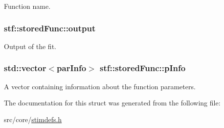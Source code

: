\label{structstf_1_1storedFunc_ac1fe235432b5de9f93817a573b6d9946}
Function name. \hypertarget{structstf_1_1storedFunc_aad9e1ffc2999387f61578bf9f7461224}{
\subsubsection[{output}]{ {\bf stf::storedFunc::output}}}
\label{structstf_1_1storedFunc_aad9e1ffc2999387f61578bf9f7461224}
Output of the fit. \hypertarget{structstf_1_1storedFunc_a2f09fc5276140a85ad4fa61bccc3fd61}{
\subsubsection[{pInfo}]{\setlength{\rightskip}{0pt plus 5cm}std::vector$<${\bf parInfo}$>$ {\bf stf::storedFunc::pInfo}}}
\label{structstf_1_1storedFunc_a2f09fc5276140a85ad4fa61bccc3fd61}
A vector containing information about the function parameters. 

The documentation for this struct was generated from the following file:\begin{DoxyCompactItemize}
\item 
src/core/\hyperlink{stimdefs_8h}{stimdefs.h}\end{DoxyCompactItemize}
